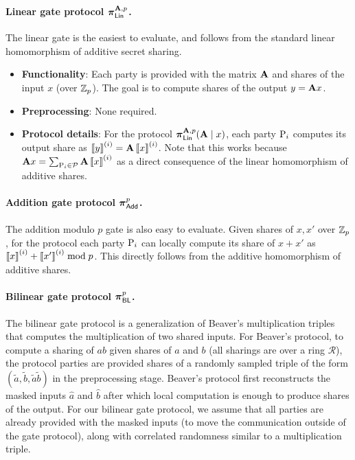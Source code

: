 \iffull

\paragraph{Linear gate protocol $\prot_\LMap^{\mat{A}, p}$.}
The linear gate is the easiest to evaluate, and follows from the standard linear homomorphism of additive secret sharing.

\begin{itemize}
  \item \textbf{Functionality}: Each party is provided with the matrix $\mat{A}$ and shares of the input $x$ (over $\mathbb{Z}_p$). The goal is to compute shares of the output $y = \mat{A}x$.

  \item \textbf{Preprocessing}: None required.

  \item \textbf{Protocol details}:
  For the protocol $\prot_\LMap^{\mat{A}, p}(\mat{A} \mid x)$, each party $\textnormal{P}_i$ computes its output share as $\sharei{y} = \mat{A}\sharei{x}$. Note that this works because $\mat{A}x = \sum_{\party_i \in \parties} \mat{A}\sharei{x}$ as a direct consequence of the linear homomorphism of additive shares.
\end{itemize}

\paragraph{Addition gate protocol $\boldsymbol{\pi}_{\textnormal{\textsf{Add}}}^{p}$.}
The addition modulo $p$ gate is also easy to evaluate. Given shares of $x, x'$ over $\mathbb{Z}_p$, for the protocol each party $\textnormal{P}_i$ can locally compute its share of $x+x'$ as $\left\llbracket x \right\rrbracket^{(i)} + \left\llbracket x' \right\rrbracket^{(i)} \bmod p$. This directly follows from the additive homomorphism of additive shares. 

\paragraph{Bilinear gate protocol $\boldsymbol{\pi}_{\textnormal{\textsf{BL}}}^p$.}
The bilinear gate protocol is a generalization of Beaver's multiplication triples~\cite{beaver1991-triples} that computes the multiplication of two shared inputs. For Beaver's protocol, to compute a sharing of $ab$ given shares of $a$ and $b$ (all sharings are over a ring $\mathcal{R}$), the protocol parties are provided shares of a randomly sampled triple of the form $(\tilde{a},\tilde{b},\tilde{a}\tilde{b})$ in the preprocessing stage. Beaver's protocol first reconstructs the masked inputs $\hat{a}$ and $\hat{b}$ after which local computation is enough to produce shares of the output. For our bilinear gate protocol, we assume that  all parties are already provided with the masked inputs (to move the communication outside of the gate protocol), along with correlated randomness similar to a multiplication triple. 

